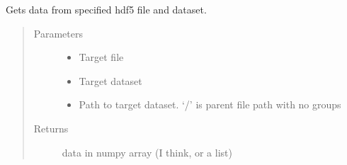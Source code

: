 \documentclass[letterpaper,10pt,english]{sphinxmanual}
\begin{document}

\begin{fulllineitems}
\label{\detokenize{index:HDF5Methods.getData}}
\sphinxAtStartPar
Gets data from specified hdf5 file and dataset.
\begin{quote}\begin{description}
\item[{Parameters}] \leavevmode\begin{itemize}
\item {} 
\sphinxAtStartPar
{} \textendash{} Target file

\item {} 
\sphinxAtStartPar
{} \textendash{} Target dataset

\item {} 
\sphinxAtStartPar
{} \textendash{} Path to target dataset. ‘/’ is parent file path with no groups

\end{itemize}

\item[{Returns}] \leavevmode
\sphinxAtStartPar
data in numpy array (I think, or a list)

\end{description}\end{quote}

\end{fulllineitems}

\end{document}
